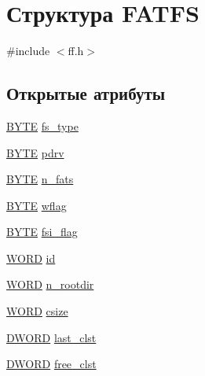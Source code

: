 \hypertarget{struct_f_a_t_f_s}{}\section{Структура F\+A\+T\+FS}
\label{struct_f_a_t_f_s}


{\ttfamily \#include $<$ff.\+h$>$}

\subsection*{Открытые атрибуты}
\begin{DoxyCompactItemize}
\item 
\mbox{\hyperlink{ff_8h_a4ae1dab0fb4b072a66584546209e7d58}{B\+Y\+TE}} \mbox{\hyperlink{struct_f_a_t_f_s_add27d97babe807b573eac98a71dc4ae5}{fs\+\_\+type}}
\item 
\mbox{\hyperlink{ff_8h_a4ae1dab0fb4b072a66584546209e7d58}{B\+Y\+TE}} \mbox{\hyperlink{struct_f_a_t_f_s_acae426c920cd7f59e5883f948e1b3184}{pdrv}}
\item 
\mbox{\hyperlink{ff_8h_a4ae1dab0fb4b072a66584546209e7d58}{B\+Y\+TE}} \mbox{\hyperlink{struct_f_a_t_f_s_a56716c7e7ac10cf46e73ffb2a2e9b545}{n\+\_\+fats}}
\item 
\mbox{\hyperlink{ff_8h_a4ae1dab0fb4b072a66584546209e7d58}{B\+Y\+TE}} \mbox{\hyperlink{struct_f_a_t_f_s_a647e43c9ccae94b7274793d1909897de}{wflag}}
\item 
\mbox{\hyperlink{ff_8h_a4ae1dab0fb4b072a66584546209e7d58}{B\+Y\+TE}} \mbox{\hyperlink{struct_f_a_t_f_s_a84e9cdc5a6a8e33ea7ec192058abf161}{fsi\+\_\+flag}}
\item 
\mbox{\hyperlink{ff_8h_a197942eefa7db30960ae396d68339b97}{W\+O\+RD}} \mbox{\hyperlink{struct_f_a_t_f_s_a417095d7c20d56d417dc0998e0dd5a5c}{id}}
\item 
\mbox{\hyperlink{ff_8h_a197942eefa7db30960ae396d68339b97}{W\+O\+RD}} \mbox{\hyperlink{struct_f_a_t_f_s_a189a00aa038044ffad0fc7f7dcf2aae1}{n\+\_\+rootdir}}
\item 
\mbox{\hyperlink{ff_8h_a197942eefa7db30960ae396d68339b97}{W\+O\+RD}} \mbox{\hyperlink{struct_f_a_t_f_s_ad7fa7a509f8d097a9ab182d6c47be568}{csize}}
\item 
\mbox{\hyperlink{ff_8h_ad342ac907eb044443153a22f964bf0af}{D\+W\+O\+RD}} \mbox{\hyperlink{struct_f_a_t_f_s_ac26e848817569fedc15a9a4e49ddedd1}{last\+\_\+clst}}
\item 
\mbox{\hyperlink{ff_8h_ad342ac907eb044443153a22f964bf0af}{D\+W\+O\+RD}} \mbox{\hyperlink{struct_f_a_t_f_s_ac834248773bf338df807f0d7e6b6a579}{free\+\_\+clst}}

\end{DoxyCompactItemize}
